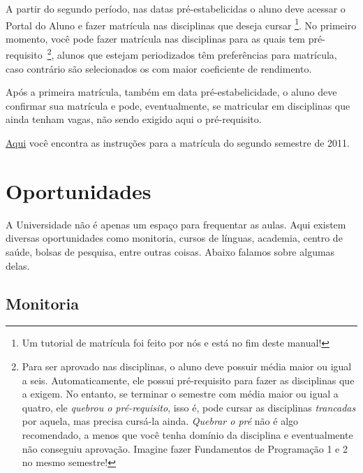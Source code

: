 \documentclass[a4paper,12pt,openany]{article}
\begin{document}
A partir do segundo período, nas datas pré-estabelicidas o aluno deve acessar o Portal do Aluno e fazer matrícula nas disciplinas que deseja cursar \footnote{Um tutorial de matrícula foi feito por nós e está no fim deste manual!}. No primeiro momento, você pode fazer matrícula nas disciplinas para as quais tem pré-requisito~\footnote{Para ser aprovado nas disciplinas, o aluno deve possuir média maior ou igual a seis. Automaticamente, ele possui pré-requisito para fazer as disciplinas que a exigem. No entanto, se terminar o semestre com média maior ou igual a quatro, ele \textit{quebrou o pré-requisito}, isso é, pode cursar as disciplinas \textit{trancadas} por aquela, mas precisa cursá-la ainda. \textit{Quebrar o pré} não é algo recomendado, a menos que você tenha domínio da disciplina e eventualmente não conseguiu aprovação. Imagine fazer Fundamentos de Programação 1 e 2 no mesmo semestre!}, 
alunos que estejam periodizados têm preferências para matrícula, caso contrário são selecionados os com maior coeficiente de rendimento. 

Após a primeira matrícula, também em data pré-estabelicidade, o aluno deve confirmar sua matrícula e pode, eventualmente, se matricular em disciplinas que ainda tenham vagas, não sendo exigido aqui o pré-requisito. 

 \href{http://www.utfpr.edu.br/curitiba/alunos/08-07-11-instrucao-de-matricula-bacharelados-e-licenciaturas/view}{Aqui} você encontra as instruções para a matrícula do segundo semestre de 2011. 



\newpage
\section{Oportunidades}

A Universidade não é apenas um espaço para frequentar as aulas. Aqui existem diversas oportunidades como monitoria, cursos de línguas, academia, centro de saúde, bolsas de pesquisa, entre outras coisas. Abaixo falamos sobre algumas delas.


\subsection{Monitoria}
\end{document}
